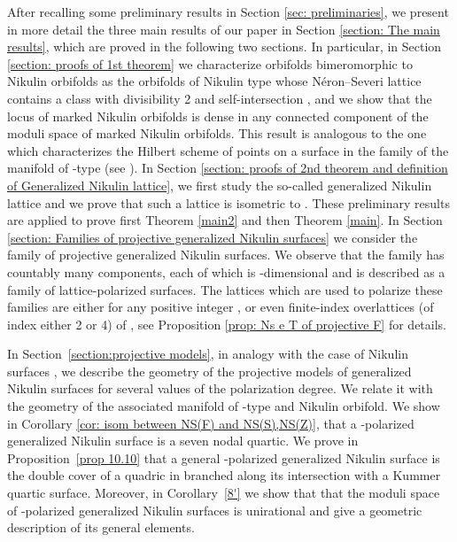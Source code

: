 \documentclass{amsart}
\makeatletter
\theoremstyle{definition}
\numberwithin{equation}{section}
\numberwithin{equation}{section} \theoremstyle{definition}
\newcounter{mathrecordid}
\newcommand{\mathboxbegin}[1]{%
  \stepcounter{mathrecordid}%
  \immediate\write\mathrecords{\themathrecordid,#1}%
  \special{pdf:bann << /Type /Annot /Subtype /Link /Border [0 0 0]
    /MathBoxID \themathrecordid /F 2
    /A << /S /URI /URI (urn:mathbox:\themathrecordid) >> >>}}
\newcommand{\mathboxinlineplain}[1]{$#1$}
\newcommand{\mathboxinline}[1]{%
  $\mathboxbegin{inline}%
  \special{pdf:literal direct /MathBoxBegin\themathrecordid\space MP}%
  #1\special{pdf:literal direct /MathBoxEnd\themathrecordid\space MP}%
  \special{pdf:eann}$}
\newcommand{\recordmath}{%
  \ifmeasuring@\expandafter\mathboxinlineplain
  \else\expandafter\mathboxinline\fi}
\makeatother
\begin{document}
After recalling some preliminary results in Section \ref{sec: preliminaries}, we present in more detail the three main results of our paper in Section \ref{section: The main results}, which are proved in the following two sections. In particular, in Section \ref{section: proofs of 1st theorem} we characterize orbifolds bimeromorphic to Nikulin orbifolds as the orbifolds of Nikulin type whose N\'eron--Severi lattice contains a class with divisibility 2 and self-intersection \recordmath{-4}, and we show that the locus of marked Nikulin orbifolds is dense in any connected component of the moduli space of marked Nikulin orbifolds. This result is analogous to the one which characterizes the Hilbert scheme of points on a \recordmath{K3} surface in the family of the manifold of \recordmath{K3^{[2]}}-type (see \cite[Theorem 1.1]{MarkmanMehrotra}). In Section \ref{section: proofs of 2nd theorem and definition of Generalized Nikulin lattice}, we first study the so-called generalized Nikulin lattice and 
we prove that such a lattice is isometric to \recordmath{E_7(-2)}. These preliminary results are applied to prove first Theorem \ref{main2} and then Theorem \ref{main}. 
In Section \ref{section: Families of projective generalized Nikulin surfaces} we consider the family of projective generalized Nikulin surfaces.  
We observe that the family has countably many components, each of which is \recordmath{12}-dimensional and is described as a family of lattice-polarized \recordmath{K3} surfaces. The lattices which are used to polarize these families are either \recordmath{\langle 2d\rangle\oplus E_7(-2)} for any positive integer \recordmath{d}, or even finite-index overlattices (of index either 2 or 4) of \recordmath{\langle 2d\rangle\oplus E_7(-2)}, see Proposition \ref{prop: Ns e T of projective F} for details.


In Section~\ref{section:projective models}, in analogy with the case of Nikulin
surfaces \cite{FV, vGS, GS, V}, we describe the geometry of the projective models
of generalized Nikulin surfaces for several values of the polarization degree. We
relate it with the geometry of the associated manifold of \recordmath{K3^{[2]}}-type and Nikulin
orbifold. We show
in Corollary \ref{cor: isom between NS(F) and NS(S),NS(Z)}, that a \recordmath{(\langle 2\rangle\oplus E_7(-2))}-polarized generalized Nikulin surface is a seven nodal quartic.
We prove in Proposition~\ref{prop 10.10} that a general
\recordmath{(\langle 4\rangle\oplus E_7(-2))'}-polarized generalized Nikulin surface is the
double cover of a quadric in \recordmath{\mathbb{P}^3} branched along its intersection with a
Kummer quartic surface. Moreover, in Corollary~\ref{8'} we show that that the moduli space of
\recordmath{(\langle 8\rangle \oplus E_7(-2))'}-polarized generalized Nikulin surfaces is
unirational and give a geometric description of its general elements.
\end{document}
